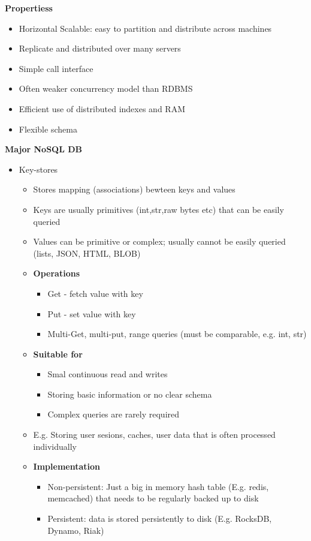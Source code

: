 \documentclass[10pt, landscape]{article}
\begin{document}
\begin{multicols}{4}
\textbf{Propertiess}
\begin{itemize}
  \item Horizontal Scalable: easy to partition and distribute across machines 
  \item Replicate and distributed over many servers 
  \item Simple call interface 
  \item Often weaker concurrency model than RDBMS 
  \item Efficient use of distributed indexes and RAM 
  \item Flexible schema
\end{itemize}


\textbf{Major NoSQL DB}
\begin{itemize}
  \item Key-stores
  \begin{itemize}
    \item Stores mapping (associations) bewteen keys and values 
    \item Keys are usually primitives (int,str,raw bytes etc) that can be easily queried 
    \item Values can be primitive or complex; usually cannot be easily queried (lists, JSON, HTML, BLOB)
    \item \textbf{Operations}
    \begin{itemize}
      \item Get - fetch value with key 
      \item Put - set value with key 
      \item Multi-Get, multi-put, range queries (must be comparable, e.g. int, str)
    \end{itemize}
    \item \textbf{Suitable for}
    \begin{itemize}
      \item Smal continuous read and writes
      \item Storing basic information or no clear schema
      \item Complex queries are rarely required
    \end{itemize}
    \item E.g. Storing user sesions, caches, user data that is often processed individually
    \item \textbf{Implementation}
    \begin{itemize}
      \item Non-persistent: Just a big in memory hash table (E.g. redis, memcached) that needs to be regularly backed up to disk
      \item Persistent: data is stored persistently to disk (E.g. RocksDB, Dynamo, Riak)
    \end{itemize}
  \end{itemize}


\end{itemize}
\end{multicols}
\end{document}
